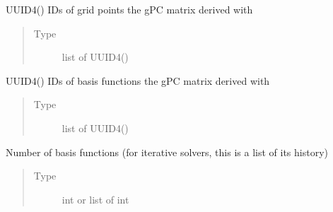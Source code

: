 \documentclass[letterpaper,10pt,english,openany,oneside]{sphinxmanual}
\begin{document}
\begin{fulllineitems}
\begin{fulllineitems}
\begin{quote}
\begin{description}
\end{description}\end{quote}

\end{fulllineitems}


\begin{fulllineitems}
\label{\detokenize{pygpc:pygpc.GPC.GPC.gpc_matrix_coords_id}}
UUID4() IDs of grid points the gPC matrix derived with
\begin{quote}\begin{description}
\item[{Type}] \leavevmode
list of UUID4()

\end{description}\end{quote}

\end{fulllineitems}


\begin{fulllineitems}
\label{\detokenize{pygpc:pygpc.GPC.GPC.gpc_matrix_b_id}}
UUID4() IDs of basis functions the gPC matrix derived with
\begin{quote}\begin{description}
\item[{Type}] \leavevmode
list of UUID4()

\end{description}\end{quote}

\end{fulllineitems}


\begin{fulllineitems}
\label{\detokenize{pygpc:pygpc.GPC.GPC.n_basis}}
Number of basis functions (for iterative solvers, this is a list of its history)
\begin{quote}\begin{description}
\item[{Type}] \leavevmode
int or list of int


\end{description}
\end{quote}
\end{fulllineitems}
\end{fulllineitems}
\end{document}

